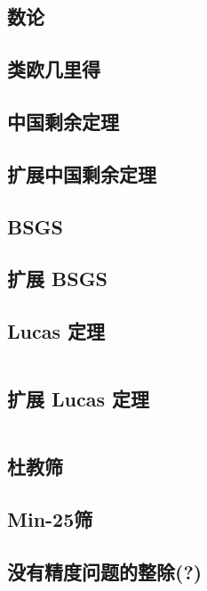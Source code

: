 \documentclass[10pt, a4paper, oneside]{ctexart}
\begin{document}
\begin{multicols}{2}
        \section{数论}
        \subsection{类欧几里得}
        
        \subsection{中国剩余定理}
        
        \subsection{扩展中国剩余定理}
        
        \subsection{BSGS}
        
        \subsection{扩展 BSGS}
        
        \subsection{Lucas 定理}
        \inputminted{cpp}{src/number theory/lucas.cpp}
        \subsection{扩展 Lucas 定理}
        \inputminted{cpp}{src/number theory/exlucas.cpp}
        \subsection{杜教筛}
        
        \subsection{Min-25筛}
        
        \subsection{没有精度问题的整除(?)}
        \inputminted{cpp}{src/number theory/div.cpp}
        \newpage


\end{multicols}
\end{document}
